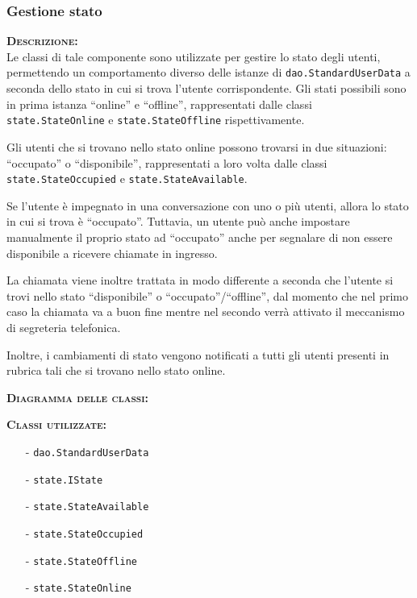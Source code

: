 \subsubsection{Gestione stato}
\begin{description}
	\item{\scshape\bfseries Descrizione:}\\
Le classi di tale componente sono utilizzate per gestire lo stato degli utenti, permettendo un comportamento diverso delle istanze di \texttt{dao.StandardUserData} a seconda dello stato in cui si trova l'utente corrispondente. Gli stati possibili sono in prima istanza ``online'' e ``offline'', rappresentati dalle classi \texttt{state.StateOnline} e \texttt{state.StateOffline} rispettivamente.

Gli utenti che si trovano nello stato online possono trovarsi in due situazioni: ``occupato'' o ``disponibile'', rappresentati a loro volta dalle classi \texttt{state.StateOccupied} e \texttt{state.StateAvailable}.

Se l'utente è impegnato in una conversazione con uno o più utenti, allora lo stato in cui si trova è ``occupato''. Tuttavia, un utente può anche impostare manualmente il proprio stato ad ``occupato'' anche per segnalare di non essere disponibile a ricevere chiamate in ingresso.
	
La chiamata viene inoltre trattata in modo differente a seconda che l'utente si trovi nello stato ``disponibile'' o ``occupato''/``offline'', dal momento che nel primo caso la chiamata va a buon fine mentre nel secondo verrà attivato il meccanismo di segreteria telefonica.
	
Inoltre, i cambiamenti di stato vengono notificati a tutti gli utenti presenti in rubrica tali che si trovano nello stato online.
	\item{\scshape\bfseries Diagramma delle classi:}
	\item{\scshape\bfseries Classi utilizzate:}\\ 
	\begin{itemize}[noitemsep,nolistsep]
		\item[-] \texttt{dao.StandardUserData}
	    \item[-] \texttt{state.IState}
	    \item[-] \texttt{state.StateAvailable}
	    \item[-] \texttt{state.StateOccupied}
	    \item[-] \texttt{state.StateOffline}
	    \item[-] \texttt{state.StateOnline}
	\end{itemize}
\end{description}

